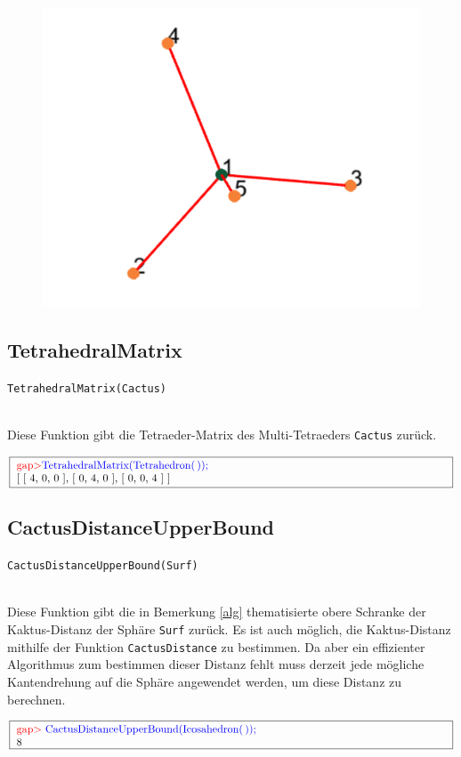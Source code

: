 \documentclass[12pt,titlepage,twoside,cleardoublepage]{article}
\theoremstyle{nummermitklammern}
\numberwithin{equation}{section}
\begin{document}
 \begin{figure}[H]
\begin{center}
\includegraphics[scale=0.5,viewport=0cm 1.5cm 12cm 11cm]{sterngraph}
\end{center}
\end{figure}
\subsection{TetrahedralMatrix}
\begin{large}
\texttt{TetrahedralMatrix(Cactus)}
\end{large}\\
Diese Funktion gibt die Tetraeder-Matrix des Multi-Tetraeders  \texttt{Cactus} zurück.
\begin{center}
$\fbox{
\parbox{14cm}{
\textcolor{red}{gap$>$}\textcolor{blue}{ TetrahedralMatrix(Tetrahedron(\,));}\newline
 [ [ 4, 0, 0 ], [ 0, 4, 0 ], [ 0, 0, 4 ] ]
}
}$
\end{center}
\subsection{CactusDistanceUpperBound}
\begin{large}
\texttt{CactusDistanceUpperBound(Surf)}
\end{large}\\
Diese Funktion gibt die in Bemerkung \ref{alg} thematisierte obere Schranke der Kaktus-Distanz der Sphäre \texttt{Surf} zurück.
Es ist auch möglich, die Kaktus-Distanz mithilfe der Funktion \texttt{CactusDistance} zu bestimmen. Da aber ein effizienter Algorithmus zum bestimmen dieser Distanz fehlt muss derzeit jede mögliche Kantendrehung auf die Sphäre angewendet werden, um diese Distanz zu berechnen. 
\begin{center}
$\fbox{
\parbox{14cm}{
\textcolor{red}{gap$>$} \textcolor{blue}{CactusDistanceUpperBound(Icosahedron(\,));}\newline
8
}
}$
\end{center}
\end{document}
